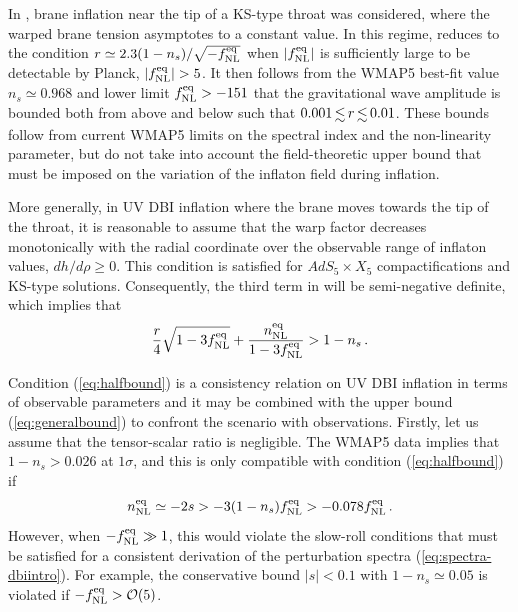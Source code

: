 In , brane inflation near the tip of a KS-type 
throat was considered, where the warped brane tension asymptotes to a 
constant value. In this regime,  reduces to 
the condition $r \simeq 2.3 (1-n_s)/\sqrt{-f_{\mathrm{NL}}^{\mathrm{eq}}}$ when $|f_{\mathrm{NL}}^{\mathrm{eq}}|$ is 
sufficiently large to be detectable by Planck, 
\iec $|f_{\mathrm{NL}}^{\mathrm{eq}}| > 5$. 
It then follows from the  
WMAP5 best-fit value $n_s \simeq 0.968$ and lower limit 
$f_{\mathrm{NL}}^{\mathrm{eq}} > -151$ \cite{Komatsu:2008hk} that the gravitational wave amplitude 
is bounded both from above and below such that $0.001 \, \lsim \, r 
\, \lsim \, 0.01$. These bounds follow from 
current WMAP5 limits on the spectral index and the 
non-linearity parameter, but do not take into account the 
field-theoretic upper bound that must be imposed 
on the variation of the inflaton field during inflation. 


More generally, in UV DBI inflation where the brane moves towards the 
tip of the throat, it is reasonable to assume 
that the warp factor decreases monotonically 
with the radial coordinate over the observable range of inflaton values, 
\iec $dh/d \rho \ge 0$. This condition is satisfied for  
$AdS_5 \times X_5$ compactifications and KS-type solutions. 
Consequently, the third term in 
 will be semi-negative definite, 
which implies that 
% 
\begin{equation}
\label{eq:halfbound}
\frac{r}{4} \sqrt{1-3f_{\mathrm{NL}}^{\mathrm{eq}}} + \frac{n_{\mathrm{NL}}^{\mathrm{eq}}}{1-3f_{\mathrm{NL}}^{\mathrm{eq}}} 
> 1-n_s \,.
\end{equation}
% 

Condition (\ref{eq:halfbound}) is a consistency relation on UV DBI 
inflation in terms of observable parameters and it 
may be combined with the upper bound 
(\ref{eq:generalbound}) to confront the scenario with observations.
Firstly, let us assume that the tensor-scalar ratio is negligible. 
The WMAP5 data implies that $1-n_s > 0.026$ at $1\sigma$, and this is only 
compatible with condition (\ref{eq:halfbound}) if 
% 
\begin{equation}
\label{eq:nnlbound}
n_{\mathrm{NL}}^{\mathrm{eq}} \simeq -2s > -3 (1-n_s ) f_{\mathrm{NL}}^{\mathrm{eq}} > -0.078 f_{\mathrm{NL}}^{\mathrm{eq}} \,.
\end{equation}
% 
However, when $-f_{\mathrm{NL}}^{\mathrm{eq}} \gg 1$, this would violate the slow-roll conditions
that must be satisfied for a consistent 
derivation of the perturbation spectra 
(\ref{eq:spectra-dbiintro}). For example, the conservative 
bound $|s| < 0.1$ with $1-n_s \simeq 0.05$ is violated if  
$-f_{\mathrm{NL}}^{\mathrm{eq}} > {\cal{O}} (5)$. 

